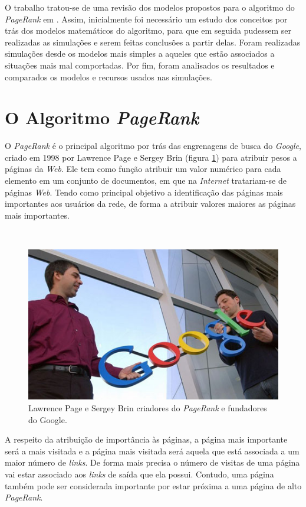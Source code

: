 \documentclass[a4paper]{report} %
\begin{document}
O trabalho tratou-se de uma revisão dos modelos propostos para o algoritmo do \textit{PageRank} em \cite{ishii2014pagerank}. Assim, inicialmente foi necessário um estudo dos conceitos por trás dos modelos matemáticos do algoritmo, para que em seguida pudessem ser realizadas as simulações e serem feitas conclusões a partir delas. Foram realizadas simulações desde os modelos mais simples a aqueles que estão associados a situações mais mal comportadas. Por fim, foram analisados os resultados e comparados os modelos e recursos usados nas simulações.


\section*{O Algoritmo \textit{PageRank}}

O \textit{PageRank} é o principal algoritmo por trás das engrenagens de busca do \textit{Google}, criado em 1998 por Lawrence Page e Sergey Brin (figura \ref{larry}) para atribuir pesos a páginas da \textit{Web}. Ele tem como função atribuir um valor numérico para cada elemento em um conjunto de documentos, em que na \textit{Internet} tratariam-se de páginas \textit{Web}. Tendo como principal objetivo a identificação das páginas mais importantes aos usuários da rede, de forma a atribuir valores maiores as páginas mais importantes.

\
\begin{figure}[!htb]
	\centering
	\includegraphics[scale=0.45]{imagens/larry}
	\caption{Lawrence Page e Sergey Brin criadores do \textit{PageRank} e fundadores do Google.}
	\label{larry}
\end{figure}

A respeito da atribuição de importância às páginas, a página mais importante será a mais visitada e a página mais visitada será aquela que está associada a um maior número de \textit{links}. De forma mais precisa o número de visitas de uma página vai estar associado aos \textit{links} de saída que ela possui. Contudo, uma página também pode ser considerada importante por estar próxima a uma página de alto \textit{PageRank}.
\end{document}
